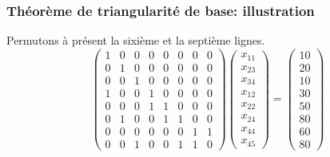 \documentclass[usepdftitle=false, aspectratio=169]{beamer}
\begin{document}
\begin{frame}
\frametitle{Théorème de triangularité de base: illustration}

Permutons à présent la sixième et la septième lignes.
\[
\begin{pmatrix}
 1 & 0 & 0 & 0 & 0 & 0 & 0 & 0 \\
 0 & 1 & 0 & 0 & 0 & 0 & 0 & 0 \\
 0 & 0 & 1 & 0 & 0 & 0 & 0 & 0 \\
 1 & 0 & 0 & 1 & 0 & 0 & 0 & 0 \\
 0 & 0 & 0 & 1 & 1 & 0 & 0 & 0 \\
 0 & 1 & 0 & 0 & 1 & 1 & 0 & 0 \\
 0 & 0 & 0 & 0 & 0 & 0 & 1 & 1 \\
 0 & 0 & 1 & 0 & 0 & 1 & 1 & 0
\end{pmatrix}
\begin{pmatrix}
x_{11} \\
x_{23} \\
x_{34} \\
x_{12} \\
x_{22} \\
x_{24} \\
x_{44} \\
x_{45}
\end{pmatrix}
=
\begin{pmatrix}
10 \\
20 \\
10 \\
30 \\
50 \\
80 \\
60 \\
80
\end{pmatrix}
\]

\end{frame}
\end{document}
